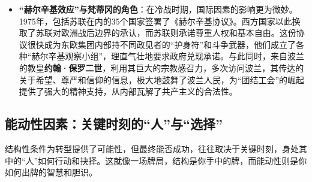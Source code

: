 \begin{itemize}
\begin{itemize}
\begin{itemize}
        \end{itemize}
        \item \textbf{“赫尔辛基效应”与梵蒂冈的角色}：在冷战时期，国际因素的影响更为微妙。1975年，包括苏联在内的35个国家签署了《赫尔辛基协议》。西方国家以此换取了苏联对欧洲战后边界的承认，而苏联则承诺尊重人权和基本自由。这份协议很快成为东欧集团内部持不同政见者的“护身符”和斗争武器，他们成立了各种“赫尔辛基观察小组”，理直气壮地要求政府兑现承诺。与此同时，来自波兰的教皇\textbf{约翰·保罗二世}，利用其巨大的宗教感召力，多次访问波兰，其传达的关于希望、尊严和信仰的信息，极大地鼓舞了波兰人民，为“团结工会”的崛起提供了强大的精神支持，从内部瓦解了共产主义的合法性。
    \end{itemize}
\end{itemize}

\subsection{能动性因素：关键时刻的“人”与“选择”}

结构性条件为转型提供了可能性，但最终能否成功，往往取决于关键时刻，身处其中的“人”如何行动和抉择。这就像一场牌局，结构是你手中的牌，而能动性则是你如何出牌的智慧和胆识。

